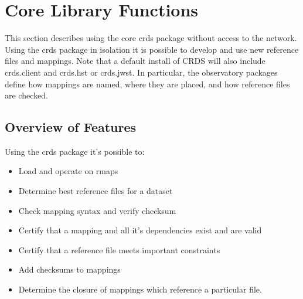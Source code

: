 \documentclass[letterpaper,10pt,english]{sphinxmanual}
\begin{document}
\chapter{Core Library Functions}
\label{core_library_functions:core-library-functions}\label{core_library_functions::doc}
This section describes using the core crds package without access to the
network.  Using the crds package in isolation it is possible to develop and use
new reference files and mappings.   Note that a default install of CRDS will
also include crds.client and crds.hst or crds.jwst.  In particular,  the
observatory packages define how mappings are named, where they are placed,
and how reference files are checked.


\section{Overview of Features}
\label{core_library_functions:overview-of-features}
Using the crds package it's possible to:
\begin{itemize}
\item {} 
Load and operate on rmaps

\item {} 
Determine best reference files for a dataset

\item {} 
Check mapping syntax and verify checksum

\item {} 
Certify that a mapping and all it's dependencies exist and are valid

\item {} 
Certify that a reference file meets important constraints

\item {} 
Add checksums to mappings

\item {} 
Determine the closure of mappings which reference a particular file.

\end{itemize}
\end{document}

